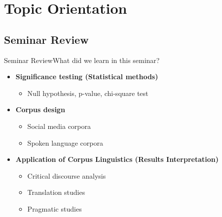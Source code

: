 %
%
%

\section{Topic Orientation}
\subsection{Seminar Review}
\begin{frame}[t]{Seminar Review}{What did we learn in this seminar?}
	\begin{itemize}
		
		\item \textbf{Significance testing (Statistical methods)}
		\begin{itemize}
			\item Null hypothesis, p-value, chi-square test
		\end{itemize}
		\bigbreak
			
		\item \textbf{Corpus design}
		\begin{itemize}
			\item Social media corpora
			\item Spoken language corpora
		\end{itemize}
		\bigbreak
		
		\item \textbf{Application of  Corpus Linguistics (Results Interpretation)}
		\begin{itemize}
			\item Critical discourse analysis
			\item Translation studies
			\item Pragmatic studies
		\end{itemize}
		
	\end{itemize}
\end{frame}


